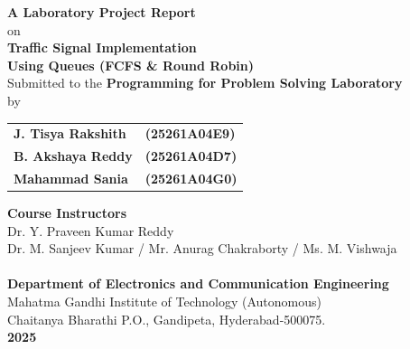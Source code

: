 \documentclass[12pt,a4paper]{article}
\begin{document}
\begin{titlepage}
    \centering
    \vspace*{1cm}

    {\large \textbf{A Laboratory Project Report}}\\[0.4cm]
    {\normalsize on}\\[0.8cm]

    {\LARGE \textbf{Traffic Signal Implementation\\[0.3cm] Using Queues (FCFS \& Round Robin)}}\\[1.2cm]

    {\normalsize Submitted to the \textbf{Programming for Problem Solving Laboratory}}\\[0.4cm]
    {\normalsize by}\\[0.8cm]

    \begin{tabular}{ll}
        \textbf{J. Tisya Rakshith}& \textbf{(25261A04E9)}\\[0.3cm]
        \textbf{B. Akshaya Reddy}& \textbf{(25261A04D7)}\\[0.3cm]
        \textbf{Mahammad Sania}& \textbf{(25261A04G0)}\\
    \end{tabular}

    \vspace{1cm}
    {\normalsize \textbf{Course Instructors}}\\[0.3cm]
    {\normalsize Dr. Y. Praveen Kumar Reddy}\\
    {\normalsize Dr. M. Sanjeev Kumar / Mr. Anurag Chakraborty / Ms. M. Vishwaja}\\[1.2cm]

    \\[1cm]

    {\large \textbf{Department of Electronics and Communication Engineering}}\\[0.4cm]
    {\normalsize Mahatma Gandhi Institute of Technology (Autonomous)}\\
    {\normalsize Chaitanya Bharathi P.O., Gandipeta, Hyderabad-500075.}\\[0.8cm]
    {\large \textbf{2025}}
\end{titlepage}
\end{document}
